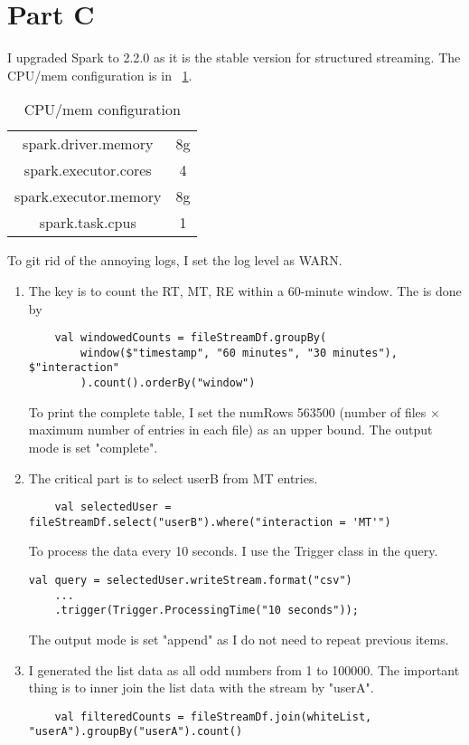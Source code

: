 \section{Part C}



I upgraded Spark to 2.2.0 as it is the stable version for structured streaming. The CPU/mem configuration is in \tablename{~\ref{a2:pa:cfg}}.
\begin{table}[h]
	\centering
	\begin{tabular}{|c|c|}
		\hline
		spark.driver.memory  &            8g \\
		spark.executor.cores  &           4 \\
		spark.executor.memory  &          8g \\
		spark.task.cpus         &         1 \\
		\hline
	\end{tabular}
	\caption{CPU/mem configuration}
	\label{a2:pa:cfg}
\end{table}
To git rid of the annoying logs, I set the log level as WARN.

\begin{enumerate}[label=Question \arabic*.]
\item The key is to count the RT, MT, RE within a 60-minute window. The is done by
\begin{verbatim}
    val windowedCounts = fileStreamDf.groupBy(
	    window($"timestamp", "60 minutes", "30 minutes"), $"interaction"
	    ).count().orderBy("window")
\end{verbatim}

To print the complete table, I set the numRows 563500 (number of files $\times$ maximum number of entries in each file) as an upper bound. The output mode is set "complete".

\item The critical part is to select userB from MT entries. 
\begin{verbatim}
	val selectedUser = fileStreamDf.select("userB").where("interaction = 'MT'")
\end{verbatim}
To process the data every 10 seconds. I use the Trigger class in the query.
\begin{verbatim}
val query = selectedUser.writeStream.format("csv")
	...
	.trigger(Trigger.ProcessingTime("10 seconds"));
\end{verbatim}
The output mode is set "append" as I do not need to repeat previous items.
\item I generated the list data as all odd numbers from 1 to 100000. The important thing is to inner join the list data with the stream by "userA".
\begin{verbatim}
	val filteredCounts = fileStreamDf.join(whiteList, "userA").groupBy("userA").count()
\end{verbatim}
    
\end{enumerate}
